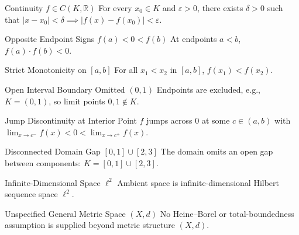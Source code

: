 \documentclass[11pt]{article}
\begin{document}
\begin{soundhyp}[id=hyp_continuous]{Continuity $f \in C(K, \mathbb{R})$}
\label{hyp:continuous}
For every $x_0 \in K$ and $\varepsilon > 0$, there exists $\delta > 0$ such that $|x - x_0| < \delta \implies |f(x) - f(x_0)| < \varepsilon$.
\end{soundhyp}

\begin{soundhyp}[id=hyp_sign_change]{Opposite Endpoint Signs $f(a) < 0 < f(b)$}
\label{hyp:sign}
At endpoints $a < b$, $f(a) \cdot f(b) < 0$.
\end{soundhyp}

\begin{soundhyp}[id=hyp_strict_mono]{Strict Monotonicity on $[a,b]$}
\label{hyp:mono}
For all $x_1 < x_2$ in $[a,b]$, $f(x_1) < f(x_2)$.
\end{soundhyp}

\begin{soundhyp}[id=hyp_open_interval]{Open Interval Boundary Omitted $(0,1)$}
\label{hyp:open}
Endpoints are excluded, e.g., $K = (0, 1)$, so limit points $0, 1 \notin K$.
\end{soundhyp}

\begin{soundhyp}[id=hyp_jump_discont]{Jump Discontinuity at Interior Point}
\label{hyp:jump}
$f$ jumps across $0$ at some $c \in (a, b)$ with $\lim_{x \to c^-} f(x) < 0 < \lim_{x \to c^+} f(x)$.
\end{soundhyp}

\begin{soundhyp}[id=hyp_domain_gap]{Disconnected Domain Gap $[0,1] \cup [2,3]$}
\label{hyp:gap}
The domain omits an open gap between components: $K = [0,1] \cup [2,3]$.
\end{soundhyp}

\begin{soundhyp}[id=hyp_inf_dim_space]{Infinite-Dimensional Space $\ell^2$}
\label{hyp:infdim}
Ambient space is infinite-dimensional Hilbert sequence space $\ell^2$.
\end{soundhyp}

\begin{soundhyp}[id=hyp_general_metric]{Unspecified General Metric Space $(X,d)$}
\label{hyp:metric}
No Heine--Borel or total-boundedness assumption is supplied beyond metric structure $(X,d)$.
\end{soundhyp}
\end{document}
